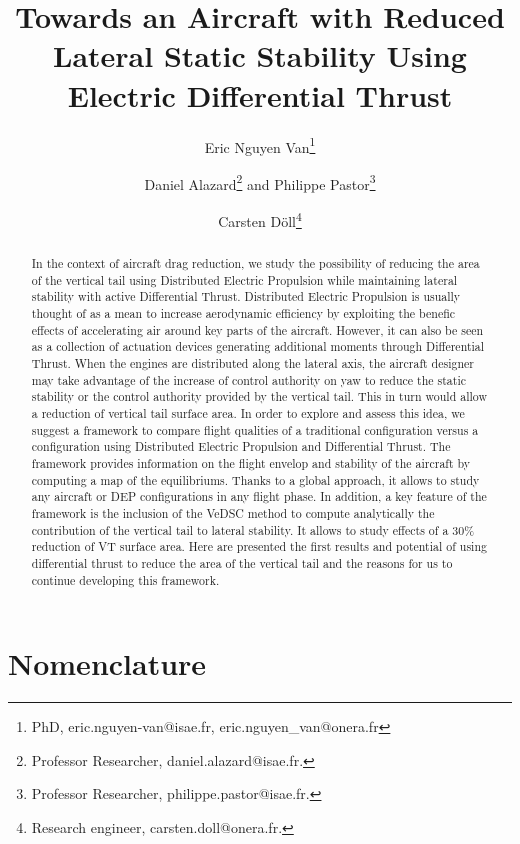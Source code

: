 \documentclass[conf]{new-aiaa} %
\title{Towards an Aircraft with Reduced Lateral Static Stability Using Electric Differential Thrust}
\author{Eric Nguyen Van\footnote{PhD, eric.nguyen-van@isae.fr, eric.nguyen\_van@onera.fr}}
\affil{ISAE DCAS, Toulouse, France}
\affil{ONERA DTIS, Toulouse France}
\author{Daniel Alazard\footnote{Professor Researcher, daniel.alazard@isae.fr.} and Philippe Pastor\footnote{Professor Researcher, philippe.pastor@isae.fr.}}
\affil{ISAE DCAS, Toulouse, France}
\author{Carsten D\"oll\footnote{Research engineer, carsten.doll@onera.fr.}}
\affil{ONERA DTIS, Toulouse, France}
\begin{document}
\maketitle

\begin{abstract}
In the context of aircraft drag reduction, we study the possibility of reducing the area of the vertical tail using Distributed Electric Propulsion while maintaining lateral stability with active Differential Thrust. Distributed Electric Propulsion is usually thought of as a mean to increase aerodynamic efficiency by exploiting the benefic effects of accelerating air around key parts of the aircraft. However, it can also be seen as a collection of actuation devices generating additional moments through Differential Thrust. When the engines are distributed along the lateral axis, the aircraft designer may take advantage of the increase of control authority on yaw to reduce the static stability or the control authority provided by the vertical tail. This in turn would allow a reduction of vertical tail surface area. In order to explore and assess this idea, we suggest a framework to compare flight qualities of a traditional configuration versus a configuration using Distributed Electric Propulsion and Differential Thrust. The framework provides information on the flight envelop and stability of the aircraft by computing a map of the equilibriums. Thanks to a global approach, it allows to study any aircraft or DEP configurations in any flight phase. In addition, a key feature of the framework is the inclusion of the VeDSC method to compute analytically the contribution of the vertical tail to lateral stability. It allows to study effects of a 30\% reduction of VT surface area. Here are presented the first results and potential of using differential thrust to reduce the area of the vertical tail and the reasons for us to continue developing this framework.
\end{abstract}

\clearpage

\section*{Nomenclature}

\end{document}

